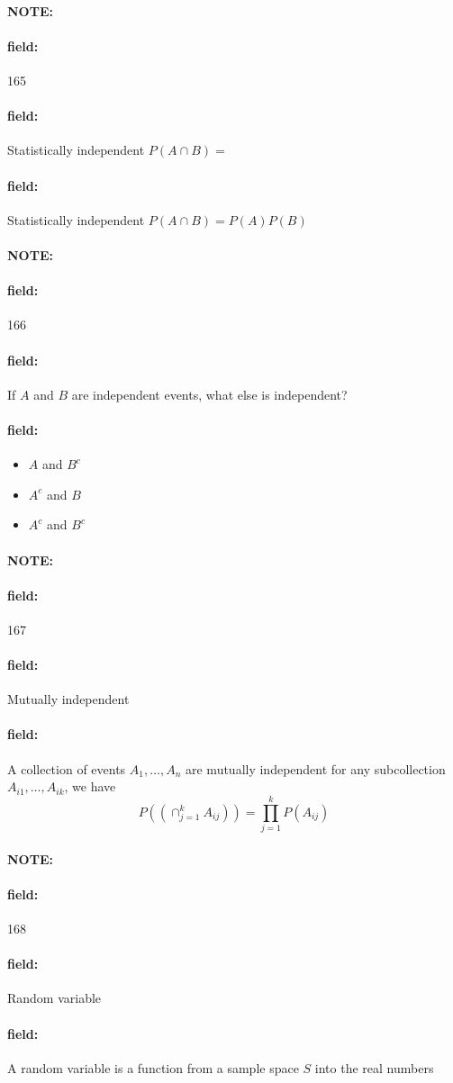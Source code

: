 \documentclass[12pt]{article}
\newenvironment{note}{\paragraph{NOTE:}}{}
\newenvironment{field}{\paragraph{field:}}{}
\begin{document}
\begin{note} \begin{field} \tiny 165 \end{field}
  \begin{field}
    Statistically independent
    $P(A \cap B) = $
  \end{field}
  \begin{field}
    Statistically independent
    $P(A \cap B) = P(A)P(B)$
  \end{field}
\end{note}

\begin{note} \begin{field} \tiny 166 \end{field}
  \begin{field}
    If $A$ and $B$ are independent events, what else is independent?
  \end{field}
  \begin{field}
    \begin{itemize}
      \item $A $ and $B^c$
      \item $A^c$ and $B$
      \item $A^c$ and $B^c$
    \end{itemize}
  \end{field}
\end{note}

\begin{note} \begin{field} \tiny 167 \end{field}
  \begin{field}
    Mutually independent
  \end{field}
  \begin{field}
    A collection of events $A_1, \ldots , A_n$ are mutually independent for any subcollection $A_{i1}, \ldots , A_{ik}$, we have
    $$ P((\cap_{j=1}^k A_{ij})) = \prod_{j=1}^k P(A_{ij}) $$
  \end{field}
\end{note}

\begin{note} \begin{field} \tiny 168 \end{field}
  \begin{field}
    Random variable
  \end{field}
  \begin{field}
    A random variable is a function from a sample space $S$ into the real numbers
  \end{field}
\end{note}
\end{document}
